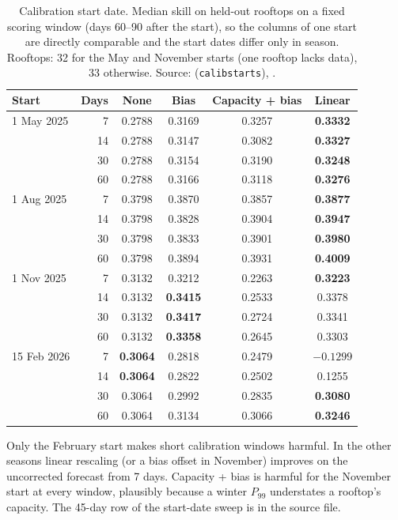 \begin{table}[H]
\centering
\caption{Calibration start date. Median skill on held-out rooftops on a fixed scoring window (days 60--90 after the start), so the columns of one start are directly comparable and the start dates differ only in season. Rooftops: 32 for the May and November starts (one rooftop lacks data), 33 otherwise. Source:  (\texttt{calibstarts}), .}
\label{tab:s-calibstarts}
\small
\begin{tabular}{@{}l r c c c c@{}}
\toprule
Start & Days & None & Bias & Capacity + bias & Linear \\
\midrule
1 May 2025 & 7 & 0.2788 & 0.3169 & 0.3257 & \textbf{0.3332} \\
 & 14 & 0.2788 & 0.3147 & 0.3082 & \textbf{0.3327} \\
 & 30 & 0.2788 & 0.3154 & 0.3190 & \textbf{0.3248} \\
 & 60 & 0.2788 & 0.3166 & 0.3118 & \textbf{0.3276} \\
1 Aug 2025 & 7 & 0.3798 & 0.3870 & 0.3857 & \textbf{0.3877} \\
 & 14 & 0.3798 & 0.3828 & 0.3904 & \textbf{0.3947} \\
 & 30 & 0.3798 & 0.3833 & 0.3901 & \textbf{0.3980} \\
 & 60 & 0.3798 & 0.3894 & 0.3931 & \textbf{0.4009} \\
1 Nov 2025 & 7 & 0.3132 & 0.3212 & 0.2263 & \textbf{0.3223} \\
 & 14 & 0.3132 & \textbf{0.3415} & 0.2533 & 0.3378 \\
 & 30 & 0.3132 & \textbf{0.3417} & 0.2724 & 0.3341 \\
 & 60 & 0.3132 & \textbf{0.3358} & 0.2645 & 0.3303 \\
15 Feb 2026 & 7 & \textbf{0.3064} & 0.2818 & 0.2479 & $-0.1299$ \\
 & 14 & \textbf{0.3064} & 0.2822 & 0.2502 & 0.1255 \\
 & 30 & 0.3064 & 0.2992 & 0.2835 & \textbf{0.3080} \\
 & 60 & 0.3064 & 0.3134 & 0.3066 & \textbf{0.3246} \\
\bottomrule
\end{tabular}
\end{table}

Only the February start makes short calibration windows harmful. In the other seasons linear rescaling (or a bias offset in November) improves on the uncorrected forecast from 7 days. Capacity + bias is harmful for the November start at every window, plausibly because a winter $P_{99}$ understates a rooftop's capacity. The 45-day row of the start-date sweep is in the source file.

